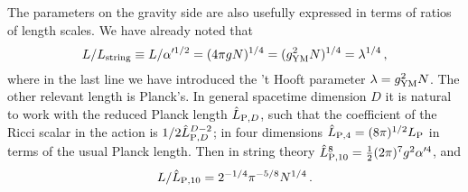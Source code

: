 \documentclass[12pt]{article}
\begin{document}
The parameters on the gravity side are also usefully expressed in terms of ratios of length scales.  We have already noted that
\begin{equation}
L/L_{\rm string} \equiv L/{\alpha'^{1/2}} = (4\pi g N)^{1/4} = (g_{\rm YM}^2N)^{1/4} = \lambda^{1/4}\,,
\label{lls}
\end{equation}
where in the last line we have introduced the 't Hooft parameter $\lambda = g_{\rm YM}^2N$.  The other relevant length is Planck's.  In general spacetime dimension $D$ it is natural to work with the reduced Planck length $\hat L_{{\rm P},D}$, such that the coefficient of the Ricci scalar in the action is $1/2\hat L_{{\rm P},D}^{D-2}$; in four dimensions $\hat L_{\rm P,4} = (8\pi)^{1/2} L_{\rm P}$ in terms of the usual Planck length.
Then in string theory $\hat L_{\rm P,10}^8 = \frac{1}{2} (2\pi)^7  g^2 \alpha'^4$, and 
\begin{equation}
L/\hat L_{\rm P,10} = 2^{-1/4} \pi^{-5/8} N^{1/4} \,.
\label{llp}
\end{equation}
\end{document}
